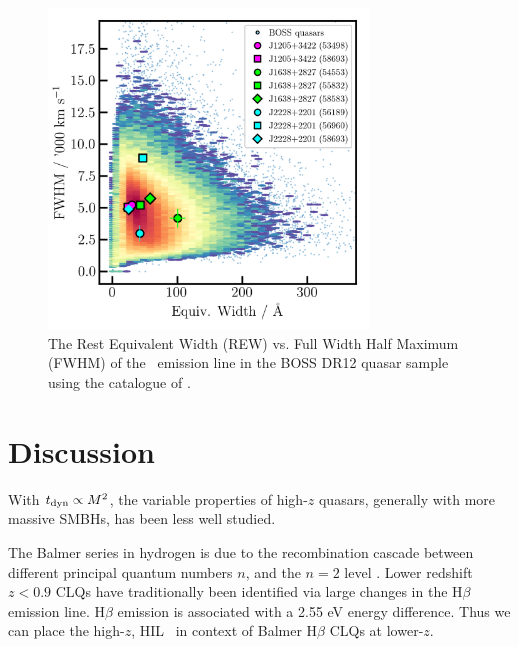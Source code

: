 \documentclass[a4paper,fleqn,usenatbib]{mnras}
\begin{document}
\begin{figure}
  \centering
  \includegraphics[width=8.5cm, trim=0.2cm 0.2cm 0.0cm 0.2cm, clip]
  {figures/CIV_CLQs_REWvsFWHM_20191029.png}
   \vspace{-12pt}
  \caption[]{The Rest Equivalent Width (REW) vs. Full Width Half Maximum (FWHM) 
of the \civ\ emission line in the BOSS DR12 quasar sample using the catalogue 
of \citet{Hamann2017}. %
}
  \label{fig:REWvsFWHM}
\end{figure}
\section{Discussion}
With $t_{\rm dyn} \propto M^{2}$, the variable properties of high-$z$
quasars, generally with more massive SMBHs, has been less well
studied.

The Balmer series in hydrogen is due to the recombination cascade
between different principal quantum numbers $n$, and
the $n=2$ level \citep[e.g., ][]{Seaton1959a, Seaton1959b}. 
Lower redshift $z<0.9$ CLQs have traditionally been identified via large changes in the
H$\beta$ emission line. H$\beta$ emission is associated with a 2.55 eV energy difference. 
Thus we can place the high-$z$, HIL \civ\ in context of Balmer H$\beta$ CLQs at lower-$z$.
\end{document}
